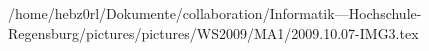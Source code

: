 /home/hebz0rl/Dokumente/collaboration/Informatik---Hochschule-Regensburg/pictures/pictures/WS2009/MA1/2009.10.07-IMG3.tex